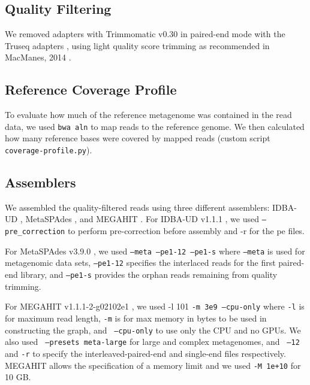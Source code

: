 \documentclass[11pt]{article}
\begin{document}
\subsection*{Quality Filtering} 

We removed adapters with Trimmomatic v0.30 in paired-end mode with the
Truseq adapters \cite{trimmomatic}, using light quality score trimming
as recommended in MacManes, 2014 \cite{macmanes2014optimal}.


\subsection*{Reference Coverage Profile}

To evaluate how much of the reference metagenome was contained in the read
data, we used {\tt bwa aln} to map reads to the reference genome.  We then
calculated how many reference bases were covered by mapped
reads (custom script {\tt coverage-profile.py}).

\subsection*{Assemblers}
We assembled the quality-filtered reads using three different assemblers: IDBA-UD
\cite{idba}, MetaSPAdes \cite{spades}, and MEGAHIT \cite{megahit}.  For
IDBA-UD v1.1.1 \cite{idba}, we used {\tt {--pre\_correction}} to
perform pre-correction before assembly and -r for the pe files.

For MetaSPAdes v3.9.0 \cite{spades}, we used { \tt {--meta --pe1-12
    --pe1-s}} where {\tt{--meta}} is used for
metagenomic data sets, {\tt{--pe1-12}} specifies the interlaced reads
for the first paired-end library, and {\tt{--pe1-s}} provides the
orphan reads remaining from quality trimming.

For MEGAHIT v1.1.1-2-g02102e1 \cite{megahit}, we used -l 101 {\tt{-m 3e9
    --cpu-only}} where {\tt -l} is for maximum read length, {\tt -m} is
for max memory in bytes to be used in constructing the graph, and {\tt
  {--cpu-only}} to use only the CPU and no GPUs. We also used {\tt
  {--presets meta-large}} for large and complex metagenomes, and {\tt
  {--12} } and {\tt{-r}} to specify the
interleaved-paired-end and single-end files respectively.  MEGAHIT allows
the specification of a memory limit and we used {\tt -M 1e+10} for 10 GB.
\end{document}
